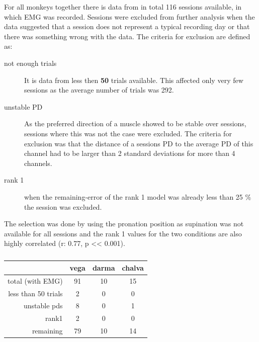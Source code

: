 For all monkeys together there is data from in total 116 sessions available, in which EMG was recorded. Sessions were excluded from further analysis when the data suggested that a session does not represent a typical recording day or that there was something wrong with the data. The criteria for exclusion are defined as:

\begin{description}
    \item[not enough trials] It is data from less then \textbf{50} trials available. This affected only very few sessions as the average number of trials was 292.
    \item[unstable PD] As the preferred direction of a muscle showed to be stable over sessions, sessions where this was not the case were excluded. The criteria for exclusion was that the distance of a sessions PD to the average PD of this channel had to be larger than 2 standard deviations for more than 4 channels.
    \item[rank 1] when the remaining-error of the rank 1 model was already less than 25 \% the session was excluded.
\end{description}
The selection was done by using the pronation position as supination was not available for all sessions and the rank 1 values for the two conditions are also highly correlated (r: 0.77, p << 0.001).


\begin{table}[ht]
	\centering
	\begin{tabular}{r|c|c|c}
		\toprule
		                    & vega  & darma & chalva \\
		\toprule
		total (with EMG)    & 91    & 10    & 15\\
		less than 50 trials & 2     & 0     & 0\\
		unstable pds        & 8     & 0     & 1\\
		rank1               & 2     & 0     & 0\\
		\bottomrule
		remaining           & 79    & 10    & 14\\		
		\bottomrule
	\end{tabular}
	\caption{}
	\label{sg:tab:sorting_table_nat}	
\end{table}


